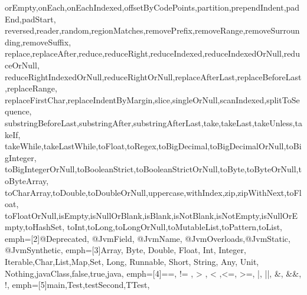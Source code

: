 {{    orEmpty,onEach,onEachIndexed,offsetByCodePoints,partition,prependIndent,padEnd,padStart,
    reversed,reader,random,regionMatches,removePrefix,removeRange,removeSurrounding,removeSuffix,
    replace,replaceAfter,reduce,reduceRight,reduceIndexed,reduceIndexedOrNull,reduceOrNull,
    reduceRightIndexedOrNull,reduceRightOrNull,replaceAfterLast,replaceBeforeLast,replaceRange,
    replaceFirstChar,replaceIndentByMargin,slice,singleOrNull,scanIndexed,splitToSequence,
    substringBeforeLast,substringAfter,substringAfterLast,take,takeLast,takeUnless,takeIf,
    takeWhile,takeLastWhile,toFloat,toRegex,toBigDecimal,toBigDecimalOrNull,toBigInteger,
    toBigIntegerOrNull,toBooleanStrict,toBooleanStrictOrNull,toByte,toByteOrNull,toByteArray,
    toCharArray,toDouble,toDoubleOrNull,uppercase,withIndex,zip,zipWithNext,toFloat,
    toFloatOrNull,isEmpty,isNullOrBlank,isBlank,isNotBlank,isNotEmpty,isNullOrEmpty,toHashSet,
    toInt,toLong,toLongOrNull,toMutableList,toPattern,toList},
    emph=[2]{@Deprecated, @JvmField, @JvmName, @JvmOverloads,@JvmStatic, @JvmSynthetic},
    emph=[3]{Array, Byte, Double, Float, Int, Integer, Iterable,Char,List,Map,Set,
    Long, Runnable, Short, String, Any, Unit, Nothing,javaClass,false,true,java},
    emph=[4]{==, != , > , < ,<=, >=, |, ||, \&, \&\&, !},
    emph=[5]{main,Test,testSecond,TTest},
}


